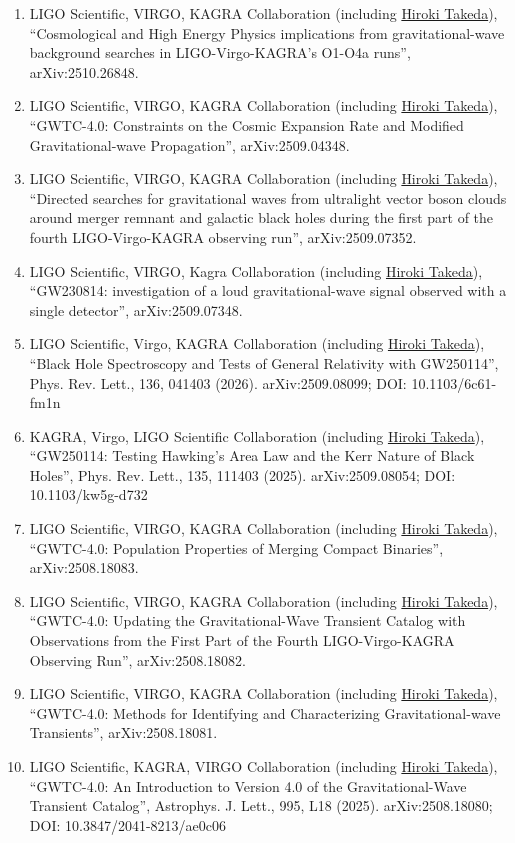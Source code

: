 \documentclass[uplatex, 12pt]{article}
\begin{document}
\begin{enumerate}
\item LIGO Scientific, VIRGO, KAGRA Collaboration (including \uline{Hiroki Takeda}), “Cosmological and High Energy Physics implications from gravitational-wave background searches in LIGO-Virgo-KAGRA's O1-O4a runs”, arXiv:2510.26848.
\item LIGO Scientific, VIRGO, KAGRA Collaboration (including \uline{Hiroki Takeda}), “GWTC-4.0: Constraints on the Cosmic Expansion Rate and Modified Gravitational-wave Propagation”, arXiv:2509.04348.
\item LIGO Scientific, VIRGO, KAGRA Collaboration (including \uline{Hiroki Takeda}), “Directed searches for gravitational waves from ultralight vector boson clouds around merger remnant and galactic black holes during the first part of the fourth LIGO-Virgo-KAGRA observing run”, arXiv:2509.07352.
\item LIGO Scientific, VIRGO, Kagra Collaboration (including \uline{Hiroki Takeda}), “GW230814: investigation of a loud gravitational-wave signal observed with a single detector”, arXiv:2509.07348.
\item LIGO Scientific, Virgo, KAGRA Collaboration (including \uline{Hiroki Takeda}), “Black Hole Spectroscopy and Tests of General Relativity with GW250114”, Phys. Rev. Lett., 136, 041403 (2026). arXiv:2509.08099; DOI: 10.1103/6c61-fm1n
\item KAGRA, Virgo, LIGO Scientific Collaboration (including \uline{Hiroki Takeda}), “GW250114: Testing Hawking's Area Law and the Kerr Nature of Black Holes”, Phys. Rev. Lett., 135, 111403 (2025). arXiv:2509.08054; DOI: 10.1103/kw5g-d732
\item LIGO Scientific, VIRGO, KAGRA Collaboration (including \uline{Hiroki Takeda}), “GWTC-4.0: Population Properties of Merging Compact Binaries”, arXiv:2508.18083.
\item LIGO Scientific, VIRGO, KAGRA Collaboration (including \uline{Hiroki Takeda}), “GWTC-4.0: Updating the Gravitational-Wave Transient Catalog with Observations from the First Part of the Fourth LIGO-Virgo-KAGRA Observing Run”, arXiv:2508.18082.
\item LIGO Scientific, VIRGO, KAGRA Collaboration (including \uline{Hiroki Takeda}), “GWTC-4.0: Methods for Identifying and Characterizing Gravitational-wave Transients”, arXiv:2508.18081.
\item LIGO Scientific, KAGRA, VIRGO Collaboration (including \uline{Hiroki Takeda}), “GWTC-4.0: An Introduction to Version 4.0 of the Gravitational-Wave Transient Catalog”, Astrophys. J. Lett., 995, L18 (2025). arXiv:2508.18080; DOI: 10.3847/2041-8213/ae0c06

\end{enumerate}
\end{document}
